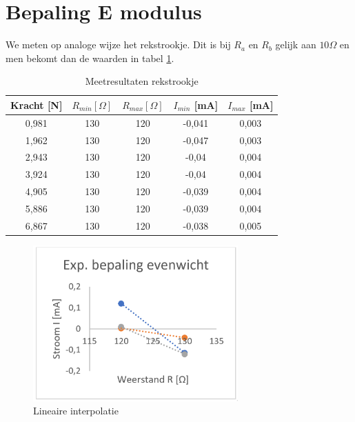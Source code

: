 \section{Bepaling E modulus}

We meten op analoge wijze het rekstrookje.
Dit is bij $R_a$ en $R_b$ gelijk aan $10\Omega$ en 
men bekomt dan de waarden in tabel \ref{tab:rekstrookje}.

\begin{table}[h]
    \centering
    \caption{Meetresultaten rekstrookje}
    \label{tab:rekstrookje}

    \begin{tabular}{| c | c | c | c | c |}
        \hline
        Kracht [N] & $R_{min} [\Omega]$& $R_{max} [\Omega]$& $I_{min}$ [mA] & $I_{max}$ [mA] \\ \hline
        0,981      & 130               & 120               & -0,041    & 0,003 \\ \hline
        1,962      & 130               & 120               &-0,047     & 0,003 \\ \hline
        2,943      & 130               & 120               &-0,04      & 0,004 \\ \hline
        3,924      & 130               & 120               &-0,04      & 0,004 \\ \hline
        4,905      & 130               & 120               &-0,039     & 0,004 \\ \hline
        5,886      & 130               & 120               &-0,039     & 0,004 \\ \hline
        6,867      & 130               & 120               &-0,038     & 0,005 \\ \hline
    \end{tabular}
\end{table}

\begin{figure}[h]
    \centering
    \caption{Lineaire interpolatie}
    \label{fig:lin_interpol_e}
    \includegraphics[width=0.7\textwidth]{img/tweede.png}
\end{figure}


